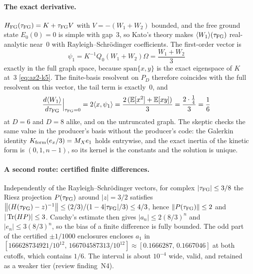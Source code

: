 \paragraph{The exact derivative.}
$H_{\rm FG}(\tau_{\mathrm{FG}})=K+\tau_{\mathrm{FG}} V$ with $V=-(W_1+W_2)$ bounded, and the free ground
state $E_0(0)=0$ is simple with gap~3, so Kato's theory makes
$\langle W_1\rangle(\tau_{\mathrm{FG}})$ real-analytic near~0 with Rayleigh--Schr\"odinger
coefficients. The first-order vector is
\begin{equation}
 \psi_1=K^{-1}Q_0(W_1+W_2)\Omega=\frac{W_1+W_2}3
 \label{eq:az2-psi1}
\end{equation}
exactly in the full graph space, because $\mathrm{span}\{x,y\}$ is the exact
eigenspace of $K$ at~3 \eqref{eq:az2-k5}. The finite-basis resolvent on $P_D$
therefore coincides with the full resolvent on this vector, the tail term is
exactly~0, and
\begin{equation}
 \frac{d\langle W_1\rangle}{d\tau_{\mathrm{FG}}}\Big|_{\tau_{\mathrm{FG}}=0}
 =2\langle x,\psi_1\rangle=\frac{2\,(\mathbb E[x^2]+\mathbb E[xy])}3
 =\frac{2\cdot\frac14}3=\frac16
 \label{eq:az2-derivative}
\end{equation}
at $D=6$ and $D=8$ alike, and on the untruncated graph. The skeptic checks the
same value in the producer's basis without the producer's code: the Galerkin
identity $K_{\rm form}(e_x/3)=M_Xe_1$ holds entrywise, and the exact inertia of
the kinetic form is $(0,1,n-1)$, so its kernel is the constants and the
solution is unique.

\paragraph{A second route: certified finite differences.}
Independently of the Rayleigh--Schr\"odinger vectors, for complex
$|\tau_{\mathrm{FG}}|\le3/8$ the Riesz projection $P(\tau_{\mathrm{FG}})$ around $|z|=3/2$ satisfies
$\left\lVert(H(\tau_{\mathrm{FG}})-z)^{-1}\right\rVert\le(2/3)/(1-4|\tau_{\mathrm{FG}}|/3)\le4/3$, hence
$\left\lVert P(\tau_{\mathrm{FG}})\right\rVert\le2$ and $|\operatorname{Tr}(HP)|\le3$. Cauchy's estimate then gives
$|a_n|\le2(8/3)^n$ and $|e_n|\le3(8/3)^n$, so the bias of a finite difference
is fully bounded. The odd part of the certified $\pm1/1000$ enclosures
encloses $a_1$ in
$[166628734921/10^{12},\,166704587313/10^{12}]\approx[0.1666287,\,0.1667046]$
at both cutoffs, which contains $1/6$. The interval is about $10^{-4}$ wide,
valid, and retained as a weaker tier (review finding~N4).

